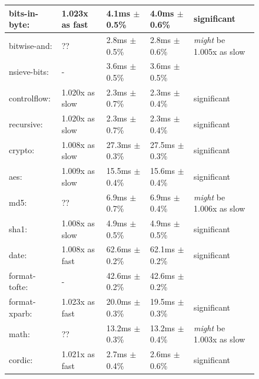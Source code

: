 \documentclass{article}
\begin{document}
\begin{figure}[H]
\begin{center}
\begin{tabular}{|l|l|l|l|l|}
\hline\hspace{0.5em} bits-in-byte:      & 1.023x as fast   &   4.1ms $\pm$ 0.5\% &    4.0ms $\pm$ 0.6\%   &  significant \\
\hline\hspace{0.5em} bitwise-and:       & ??               &   2.8ms $\pm$ 0.5\% &    2.8ms $\pm$ 0.6\%   &  \textit{might} be 1.005x as slow \\
\hline\hspace{0.5em} nsieve-bits:       & -                &   3.6ms $\pm$ 0.5\% &    3.6ms $\pm$ 0.5\% & \\
\hline\hline
controlflow:         & 1.020x as slow &   2.3ms $\pm$ 0.7\% &    2.3ms $\pm$ 0.4\%   &  significant \\
\hline\hspace{0.5em} recursive:         & 1.020x as slow &   2.3ms $\pm$ 0.7\% &    2.3ms $\pm$ 0.4\%   &  significant \\
\hline\hline
crypto:              & 1.008x as slow &  27.3ms $\pm$ 0.3\% &   27.5ms $\pm$ 0.3\%   &  significant \\
\hline\hspace{0.5em} aes:               & 1.009x as slow &  15.5ms $\pm$ 0.4\% &   15.6ms $\pm$ 0.4\%   &  significant \\
\hline\hspace{0.5em} md5:               & ??               &   6.9ms $\pm$ 0.7\% &    6.9ms $\pm$ 0.4\%   &  \textit{might} be 1.006x as slow \\
\hline\hspace{0.5em} sha1:              & 1.008x as slow &   4.9ms $\pm$ 0.5\% &    4.9ms $\pm$ 0.5\%   &  significant \\
\hline\hline
date:                & 1.008x as fast   &  62.6ms $\pm$ 0.2\% &   62.1ms $\pm$ 0.2\%   &  significant \\
\hline\hspace{0.5em} format-tofte:      & -                &  42.6ms $\pm$ 0.2\% &   42.6ms $\pm$ 0.2\%   & \\
\hline\hspace{0.5em} format-xparb:      & 1.023x as fast   &  20.0ms $\pm$ 0.3\% &   19.5ms $\pm$ 0.3\%   &  significant \\
\hline\hline
math:                & ??               &  13.2ms $\pm$ 0.3\% &   13.2ms $\pm$ 0.4\%   &  \textit{might} be 1.003x as slow \\
\hline\hspace{0.5em} cordic:            & 1.021x as fast   &   2.7ms $\pm$ 0.4\% &    2.6ms $\pm$ 0.6\%   &  significant \\

\end{tabular}
\end{center}
\end{figure}
\end{document}
